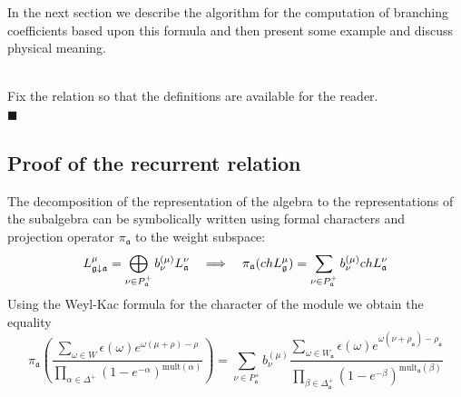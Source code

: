 \documentclass[a4paper,12pt]{article}
\theoremstyle{definition} \newtheorem{Def}{Definition}
\newenvironment{comment}
{\par\noindent{\bf TODO}\\}
{\\\hfill$\scriptstyle\blacksquare$\par}
\begin{document}
In the next section we describe the algorithm for the computation of branching coefficients based upon this formula and then present some example and discuss physical meaning.
\begin{comment}
  Fix the relation so that the definitions are available for the reader.
\end{comment}
\subsection{Proof of the recurrent relation}
\label{sec:proof}

The decomposition of the representation of the algebra to the representations of the subalgebra can be symbolically written using formal characters and projection operator $\pi_{\mathfrak{a}}$ to the weight subspace:
\begin{equation}
  \label{eq:3}
  L_{\frak{g}\downarrow \frak{a}}^{\mu }=\bigoplus\limits_{\nu \in P_{\frak{a}%
    }^{+}}b_{\nu }^{\left( \mu \right) }L_{\frak{a}}^{\nu }\quad
  \Longrightarrow\quad
  \pi_{\mathfrak{a}}(ch L^{\mu}_{\mathfrak{g}})=\sum_{\nu\in P^{+}_{\mathfrak{a}}}b^{(\mu)}_{\nu} ch L^{\nu}_{\mathfrak{a}}
\end{equation}
Using the Weyl-Kac formula for the character of the module
we obtain the equality
\begin{equation}
  \label{eq:4}
  \pi_{\mathfrak{a}}\left(\frac{\sum_{\omega\in W} \epsilon(\omega) e^{\omega(\mu+\rho)-\rho}}{\prod_{\alpha\in\Delta^{+}}(1-e^{-\alpha})^{\mathrm{mult}(\alpha)}}\right) = 
  \sum_{\nu\in P^{+}_{\mathfrak{a}}}b^{(\mu)}_{\nu}
  \frac{\sum_{\omega\in W_{\mathfrak{a}}}\epsilon(\omega)e^{\omega(\nu+\rho_{\mathfrak{a}})-\rho_{\mathfrak{a}}}}{\prod_{\beta\in \Delta_{\mathfrak{a}}^{+}}(1-e^{-\beta})^{\mathrm{mult}_{\mathfrak{a}}(\beta)}}
\end{equation}
\end{document}
